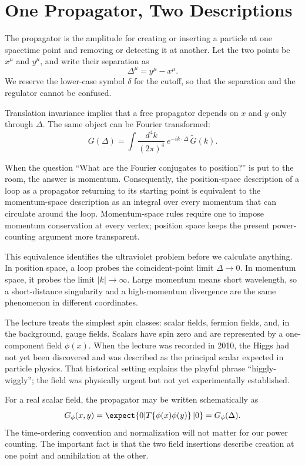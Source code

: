 \section{One Propagator, Two Descriptions}

The propagator is the amplitude for creating or inserting a particle at one spacetime point and removing or detecting it at another. Let the two points be \(x^\mu\) and \(y^\mu\), and write their separation as
\begin{equation}
\Delta^\mu=y^\mu-x^\mu.
\end{equation}
We reserve the lower-case symbol \(\delta\) for the cutoff, so that the separation and the regulator cannot be confused.

Translation invariance implies that a free propagator depends on \(x\) and \(y\) only through \(\Delta\). The same object can be Fourier transformed:
\begin{equation}
G(\Delta)
=\int\frac{d^4k}{(2\pi)^4}\,e^{-ik\cdot\Delta}\,\widetilde G(k).
\end{equation}

When the question ``What are the Fourier conjugates to position?'' is put to the room, the answer is momentum. Consequently, the position-space description of a loop as a propagator returning to its starting point is equivalent to the momentum-space description as an integral over every momentum that can circulate around the loop. Momentum-space rules require one to impose momentum conservation at every vertex; position space keeps the present power-counting argument more transparent.

This equivalence identifies the ultraviolet problem before we calculate anything. In position space, a loop probes the coincident-point limit \(\Delta\to0\). In momentum space, it probes the limit \(|k|\to\infty\). Large momentum means short wavelength, so a short-distance singularity and a high-momentum divergence are the same phenomenon in different coordinates.

The lecture treats the simplest spin classes: scalar fields, fermion fields, and, in the background, gauge fields. Scalars have spin zero and are represented by a one-component field \(\phi(x)\). When the lecture was recorded in 2010, the Higgs had not yet been discovered and was described as the principal scalar expected in particle physics. That historical setting explains the playful phrase ``higgly-wiggly''; the field was physically urgent but not yet experimentally established.

For a real scalar field, the propagator may be written schematically as
\begin{equation}
G_\phi(x,y)=\expect{0|T\!\left\{\phi(x)\phi(y)\right\}|0}
=G_\phi(\Delta).
\end{equation}
The time-ordering convention and normalization will not matter for our power counting. The important fact is that the two field insertions describe creation at one point and annihilation at the other.

